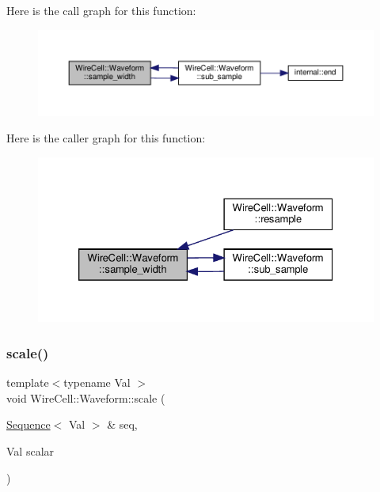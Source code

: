 Here is the call graph for this function\+:
\nopagebreak
\begin{figure}[H]
\begin{center}
\leavevmode
\includegraphics[width=350pt]{namespace_wire_cell_1_1_waveform_a76b0099d7c51a9e0a915bbee0fe48069_cgraph}
\end{center}
\end{figure}
Here is the caller graph for this function\+:
\nopagebreak
\begin{figure}[H]
\begin{center}
\leavevmode
\includegraphics[width=326pt]{namespace_wire_cell_1_1_waveform_a76b0099d7c51a9e0a915bbee0fe48069_icgraph}
\end{center}
\end{figure}
\mbox{\label{namespace_wire_cell_1_1_waveform_aa8d25ae88346929b5e54cd116f7a4f47}} 
\subsubsection{\texorpdfstring{scale()}{scale()}\hspace{0.1cm}{\footnotesize\ttfamily [1/3]}}
{\footnotesize\ttfamily template$<$typename Val $>$ \\
void Wire\+Cell\+::\+Waveform\+::scale (\begin{DoxyParamCaption}\item[{\hyperlink{namespace_wire_cell_1_1_waveform_a1d2a1b672e3b220dcd64a994531de95d}{Sequence}$<$ Val $>$ \&}]{seq,  }\item[{Val}]{scalar }\end{DoxyParamCaption})}



